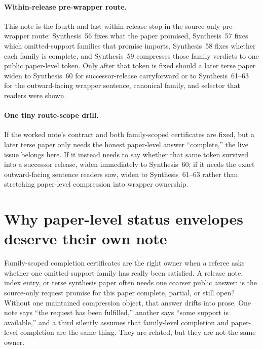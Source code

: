 \documentclass[11pt]{article}
\begin{document}
\paragraph{Within-release pre-wrapper route.}
This note is the fourth and last within-release stop in the source-only pre-wrapper route: Synthesis~56 fixes what the paper promised, Synthesis~57 fixes which omitted-support families that promise imports, Synthesis~58 fixes whether each family is complete, and Synthesis~59 compresses those family verdicts to one public paper-level token. Only after that token is fixed should a later terse paper widen to Synthesis~60 for successor-release carryforward or to Synthesis~61--63 for the outward-facing wrapper sentence, canonical family, and selector that readers were shown.\cite{series:publicrequestcontracts,series:requestableevidenceclasses,series:requestfulfillmentcertificates,series:publicrequestcarryforward,series:publicrequestnotices,series:publicrequestnoticenormalforms,series:publicrequestnoticeselections}

\paragraph{One tiny route-scope drill.}
If the worked note's contract and both family-scoped certificates are fixed, but a later terse paper only needs the honest paper-level answer ``complete,'' the live issue belongs here. If it instead needs to say whether that same token survived into a successor release, widen immediately to Synthesis~60; if it needs the exact outward-facing sentence readers saw, widen to Synthesis~61--63 rather than stretching paper-level compression into wrapper ownership.\cite{series:workedexample}

\section{Why paper-level status envelopes deserve their own note}
Family-scoped completion certificates are the right owner when a referee asks whether one omitted-support family has really been satisfied.
A release note, index entry, or terse synthesis paper often needs one coarser public answer: is the source-only request promise for this paper complete, partial, or still open?
Without one maintained compression object, that answer drifts into prose.
One note says ``the request has been fulfilled,'' another says ``some support is available,'' and a third silently assumes that family-level completion and paper-level completion are the same thing.
They are related, but they are not the same owner.
\end{document}
